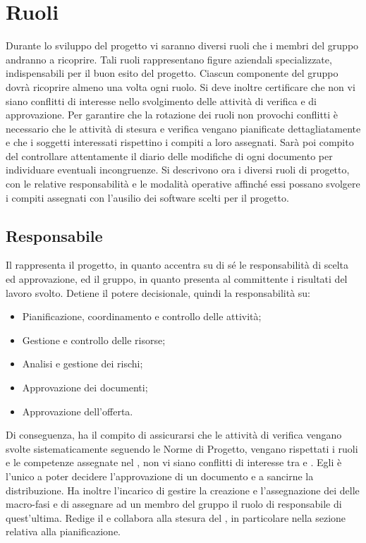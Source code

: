 \documentclass[12pt,a4paper]{article}
\begin{document}
\newpage

\section{Ruoli}\label{Ruoli}
Durante lo sviluppo del progetto vi saranno diversi ruoli che i membri del gruppo andranno a ricoprire. Tali ruoli rappresentano figure aziendali specializzate, indispensabili per il buon esito del progetto. Ciascun componente del gruppo dovrà ricoprire almeno una volta ogni ruolo. Si deve inoltre certificare che non vi siano conflitti di interesse nello svolgimento delle attività di verifica e di approvazione.
Per garantire che la rotazione dei ruoli non provochi conflitti è necessario che le attività di stesura e verifica vengano pianificate dettagliatamente e che i soggetti interessati rispettino i compiti a loro assegnati. Sarà poi compito del \VR{} controllare attentamente il diario delle modifiche di ogni documento per individuare eventuali incongruenze.
Si descrivono ora i diversi ruoli di progetto, con le relative responsabilità e le modalità operative affinché essi possano svolgere i compiti assegnati con l'ausilio dei software scelti per il progetto.

\subsection{Responsabile}
Il \PM{} rappresenta il progetto, in quanto accentra su di sé le responsabilità di scelta ed approvazione, ed il gruppo, in quanto presenta al committente i risultati del lavoro svolto.
Detiene il potere decisionale, quindi la responsabilità su:
\begin{itemize}
	\item Pianificazione, coordinamento e controllo delle attività;
	\item Gestione e controllo delle risorse;
	\item Analisi e gestione dei rischi;
	\item Approvazione dei documenti;
	\item Approvazione dell'offerta.
\end{itemize}

Di conseguenza, ha il compito di assicurarsi che le attività di verifica vengano svolte sistematicamente seguendo le Norme di Progetto, vengano rispettati i ruoli e le competenze assegnate nel \PdP{}, non vi siano conflitti di interesse tra  e . Egli è l'unico a poter decidere l'approvazione di un documento e a sancirne la distribuzione.
Ha inoltre l'incarico di gestire la creazione e l'assegnazione dei \textit{} delle macro-fasi e di assegnare ad un membro del gruppo il ruolo di responsabile di quest'ultima.
Redige il \PdP{} e collabora alla stesura del \PdQ{}, in particolare nella sezione relativa alla pianificazione.
\end{document}
